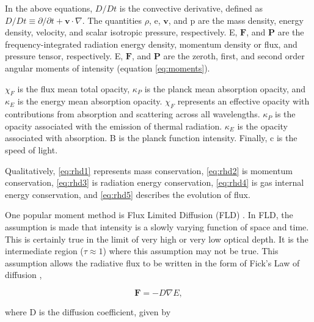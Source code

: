 In the above equations, $D/Dt$ is the convective derivative, defined as $D/Dt \equiv \partial / \partial t + \mathbf{v}\cdot \nabla$. The quantities $\rho$, e, $\mathbf{v}$, and p are the mass density, energy density, velocity, and scalar isotropic pressure, respectively. E, $\mathbf{F}$, and $\mathbf{P}$ are the frequency-integrated radiation energy density, momentum density or flux, and pressure tensor, respectively. E, $\mathbf{F}$, and $\mathbf{P}$ are the zeroth, first, and second order angular moments of intensity (equation \ref{eq:moments}).


$\chi_F$ is the flux mean total opacity, $\kappa_P$ is the planck mean absorption opacity, and $\kappa_E$ is the energy mean absorption opacity. $\chi_F$ represents an effective opacity with contributions from absorption and scattering across all wavelengths. $\kappa_P$ is the opacity associated with the emission of thermal radiation. $\kappa_E$ is the opacity associated with absorption. B is the planck function intensity. Finally, c is the speed of light.

Qualitatively, \ref{eq:rhd1} represents mass conservation, \ref{eq:rhd2} is momentum conservation, \ref{eq:rhd3} is radiation energy conservation, \ref{eq:rhd4} is gas internal energy conservation, and \ref{eq:rhd5} describes the evolution of flux.

One popular moment method is Flux Limited Diffusion (FLD) \citep{almeWilson74,levermorePomraning81,pomraning83,meliaZylstra91,anileRomano92}. In FLD, the assumption is made that intensity is a slowly varying function of space and time. This is certainly true in the limit of very high or very low optical depth. It is the intermediate region ($\tau \approx 1$) where this assumption may not be true. This assumption allows the radiative flux to be written in the form of Fick's Law of diffusion \citep{levermorePomraning81},

\begin{equation}
\label{eq:fluxfdiffusion}
\mathbf{F} = -D\nabla E,
\end{equation}

\noindent
where D is the diffusion coefficient, given by

